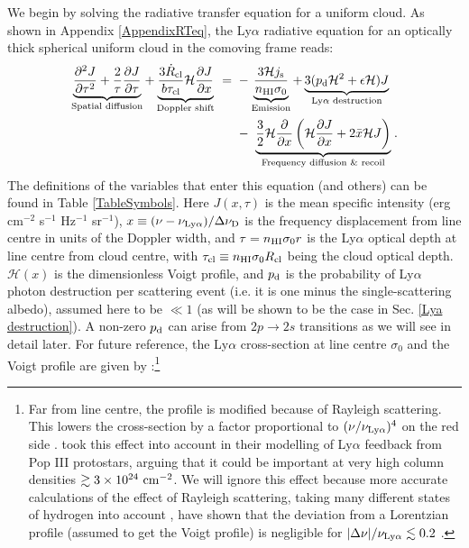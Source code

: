 \documentclass[fleqn,usenatbib]{mnras}
\newcommand{\taucl}{\tau_{\rm cl}}
\begin{document}
We begin by solving the radiative transfer equation for a uniform cloud. As shown in Appendix \ref{AppendixRTeq}, the Ly$\alpha$ radiative equation for an optically thick spherical uniform cloud in the comoving frame reads:
\begin{align}
    \underbrace{\dfrac{\partial^2 J}{\partial \tau^2} + \dfrac{2}{\tau} \dfrac{\partial J}{\partial \tau}}_{\textrm{Spatial diffusion}} + \underbrace{\dfrac{3\Dot{R}_{\rm cl}}{b \taucl } \mathcal{H} \dfrac{\partial J}{\partial x}}_{\textrm{Doppler shift}} ~=~ &-\underbrace{\dfrac{3 \mathcal{H} j_{\rm s}}{n_{\rm HI} \sigma_0}}_{\textrm{Emission}} + \underbrace{3 (p_{\rm d} \mathcal{H}^2 + \epsilon \mathcal{H}) J}_{\textrm{Ly}\alpha\textrm{ destruction}} \nonumber \\ ~&-~ \underbrace{\dfrac{3}{2} \mathcal{H} \dfrac{\partial}{\partial x} \left( \mathcal{H} \dfrac{\partial J}{\partial x} + 2\Bar{x} \mathcal{H} J \right)}_{\textrm{Frequency diffusion \& recoil}} \hspace{1 pt} \label{radtransfereq}.
\end{align}
The definitions of the variables that enter this equation (and others) can be found in Table \ref{TableSymbols}. Here $J(x,\tau)$ is the mean specific intensity (erg cm$^{-2}$ s$^{-1}$ Hz$^{-1}$ sr$^{-1}$), $x \equiv (\nu - \nu_{\textrm{Ly}\alpha})/\Delta \nu_{\rm D}$ is the frequency displacement from line centre in units of the Doppler width, and $\tau = n_{\rm HI} \sigma_0 r$ is the Ly$\alpha$ optical depth at line centre from cloud centre, with $\taucl \equiv  n_{\rm HI} \sigma_0 R_{\rm cl}$ being the cloud optical depth. $\mathcal{H}(x)$ is the dimensionless Voigt profile, and $p_{\rm d}$ is the probability of Ly$\alpha$ photon destruction per scattering event (i.e. it is one minus the single-scattering albedo), assumed here to be $\ll 1$ (as will be shown to be the case in Sec. \ref{Lya destruction}). A non-zero $p_{\rm d}$ can arise from $2p \rightarrow 2s$ transitions as we will see in detail later. For future reference, the Ly$\alpha$ cross-section at line centre $\sigma_0$ and the Voigt profile are given by \citep[e.g.][]{Dijkstra2014}:\footnote{Far from line centre, the profile is modified because of Rayleigh scattering. This lowers the cross-section by a factor proportional to $(\nu/\nu_{\rm Ly\alpha})^4$ on the red side \citep[e.g.][]{Peebles1993}. \cite{McKee2008} took this effect into account in their modelling of Ly$\alpha$ feedback from Pop III protostars, arguing that it could be important at very high column densities $\gtrsim 3 \times 10^{24} ~ \rm cm^{-2}$. We will ignore this effect because more accurate calculations of the effect of Rayleigh scattering, taking many different states of hydrogen into account \citep[in contrast to][]{Peebles1993}, have shown that the deviation from a Lorentzian profile (assumed to get the Voigt profile) is negligible for $\lvert \Delta \nu \rvert/\nu_{\rm Ly\alpha} \lesssim 0.2$ \citep[see e.g.][and discussion therein]{Mortlock2016, Kokubo2024}. }
\end{document}
